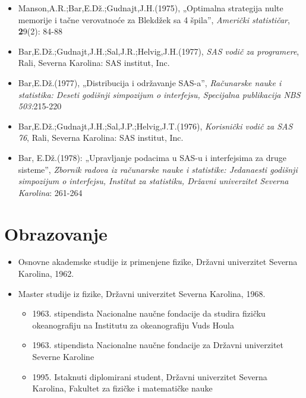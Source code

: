 \documentclass[a4paper]{article}
\begin{document}
{		\begin{itemize}
			\item Manson,A.R.;Bar,E.Dž.;Gudnajt,J.H.(1975), „Optimalna strategija nulte memorije i tačne verovatnoće za Blekdžek sa 4 špila”, \textit{Američki statističar}, \textbf29(2): 84-88
			\item Bar,E.Dž.;Gudnajt,J.H.;Sal,J.R.;Helvig,J.H.(1977), \textit{SAS vodič za programere}, Rali, Severna Karolina: SAS institut, Inc.
			\item Bar,E.Dž.(1977), „Distribucija i održavanje SAS-a”, \textit{Računarske nauke i statistika: Deseti godišnji simpozijum o interfejsu, Specijalna publikacija NBS 503:}215-220
			\item Bar,E.Dž.;Gudnajt,J.H.;Sal,J.P.;Helvig,J.T.(1976), \textit{Korisnički vodič za SAS 76}, Rali, Severna Karolina: SAS institut, Inc.
			\item Bar, E.Dž.(1978): „Upravljanje podacima u SAS-u i interfejsima za druge sisteme”, \textit{Zbornik radova iz računarske nauke i statistike: Jedanaesti godišnji simpozijum o interfejsu, Institut za statistiku, Državni univerzitet Severna Karolina}: 261-264
		\end{itemize}
		
		\newpage

		\section{Obrazovanje}
		
		\begin{itemize}
			\item Osnovne akademske studije iz primenjene fizike, Državni univerzitet Severna Karolina, 1962.
			\item Master studije iz fizike, Državni univerzitet Severna Karolina, 1968.
			\begin{itemize}
				\item 1963. stipendista Nacionalne naučne fondacije da studira fizičku okeanografiju na Institutu za okeanografiju Vuds Houla
				\item 1963. stipendista Nacionalne naučne fondacije za Državni univerzitet Severne Karoline
				\item 1995. Istaknuti diplomirani student, Državni univerzitet Severna Karolina, Fakultet za fizičke i matematičke nauke
			\end{itemize}
		\end{itemize}
		
		}
\end{document}

